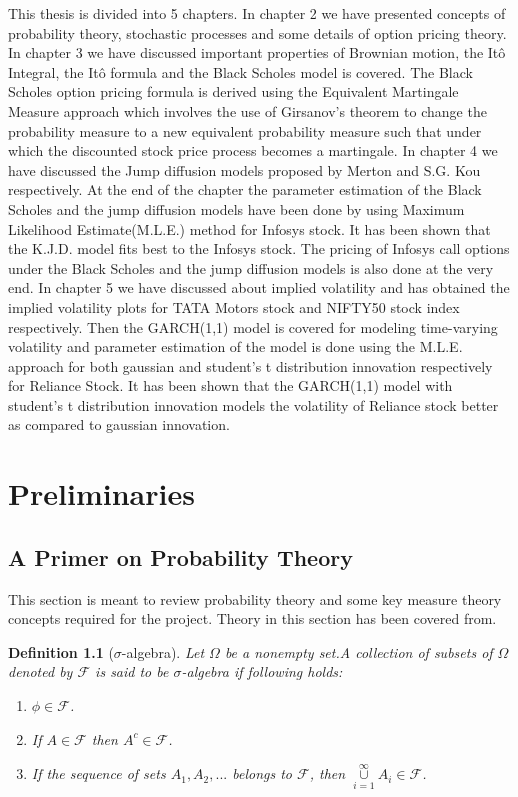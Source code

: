 \documentclass[12pt]{report}
\newtheorem{definition}{Definition}[section]
\begin{document}
This thesis is divided into 5 chapters. In chapter 2 we have presented concepts of probability theory, stochastic processes and some details of option pricing theory. In chapter 3 we have discussed important properties of Brownian motion, the Itô Integral, the Itô formula and the Black Scholes model is covered. The Black Scholes option pricing formula is derived using the Equivalent Martingale Measure approach which involves the use of Girsanov's theorem to change the probability measure to a new equivalent probability measure such that under which the discounted stock price process becomes a martingale. In chapter 4 we have discussed the Jump diffusion models proposed by Merton and S.G. Kou respectively. At the end of the chapter the parameter estimation of the Black Scholes and the jump diffusion models have been done by using Maximum Likelihood Estimate(M.L.E.) method for Infosys stock. It has been shown that the K.J.D. model fits best to the Infosys stock. The pricing of Infosys call options under the Black Scholes and the jump diffusion models is also done at the very end. In chapter 5 we have discussed about implied volatility and has obtained the implied volatility plots for TATA Motors stock and NIFTY50 stock index respectively. Then the GARCH(1,1) model is covered for modeling time-varying volatility and parameter estimation of the model is done using the M.L.E. approach for both gaussian and student's t distribution innovation respectively for Reliance Stock. It has been shown that the GARCH(1,1) model with student's t distribution innovation models the volatility of Reliance stock better as compared to gaussian innovation.           

\chapter{Preliminaries}

\section{A Primer on Probability Theory}This section is meant to review probability theory and some key measure theory concepts required for the project. Theory in this section has been covered from\cite{klenke_2020}.
\begin{definition}[$\sigma$-algebra]
Let $\Omega$ be a nonempty set.A collection  of subsets of $\Omega$ denoted by $\mathcal{F}$ is said to be $\sigma$-algebra if following holds:
\begin{enumerate}
    \item $\phi \in \mathcal{F}$.
    \item If $A \in \mathcal{F}$ then $A^c \in \mathcal{F}$.
    \item If the sequence of sets $A_1,A_2,...$ belongs to $\mathcal{F}$, then $\cup\limits_{i=1}^{\infty} A_i \in \mathcal{F}$.
\end{enumerate}
\end{definition}
\end{document}
